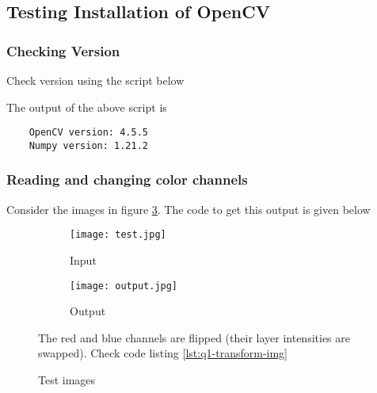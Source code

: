 \subsection{Testing Installation of OpenCV}

\subsubsection*{Checking Version}

Check version using the script below



The output of the above script is
\begin{verbatim}
    OpenCV version: 4.5.5
    Numpy version: 1.21.2
\end{verbatim}

\subsubsection*{Reading and changing color channels}

Consider the images in figure \ref{fig:q1-test-imgs}. The code to get this output is given below

\begin{figure}
    \centering
    \begin{subfigure}[b]{0.4\textwidth}
        \texttt{[image: test.jpg]}
        \caption{Input}
        \label{fig:sfig-test-in}
    \end{subfigure}
    \begin{subfigure}[b]{0.4\textwidth}
        \texttt{[image: output.jpg]}
        \caption{Output}
        \label{fig:sfig-test-out}
    \end{subfigure}
    \caption{Test images}
    \label{fig:q1-test-imgs}
    \small
        The red and blue channels are flipped (their layer intensities are swapped). Check code listing \ref{lst:q1-transform-img}
\end{figure}


